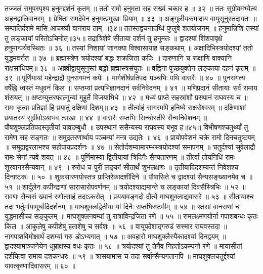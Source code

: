 तज्जलं समुपस्पृश्य हनुमद्दर्शनं कृतम् ॥
ततो रामो हनुमता सह सख्यं चकार ह ॥ ३२ ॥
ततः सुग्रीवमभ्येत्य अहनद्वालिवानरम् ॥
प्रेषिता रामदेवेन हनुमत्प्रमुखाः प्रियाम् ॥ ३३ ॥
अङ्गुलीयकमादाय वायुसूनुस्तदागतः ॥
सम्पातिर्दशमे मासि आचख्यौ वानराय ताम् ॥३४॥
ततस्तद्वचनादब्धिं पुप्लुवे शतयोजनम् ॥
हनुमान्निशि तस्यां तु लङ्कायां परितोऽचिनोत्॥३५॥
तद्रात्रिशेषे सीताया दर्शनं तु हनूमतः ॥
द्वादश्यां शिंशपावृक्षे हनुमान्पर्यवस्थितः ॥ ३६ ॥
तस्यां निशायां जानक्या विश्वासायाह सङ्कथाम् ॥
अक्षादिभिस्त्रयोदश्यां ततो युद्धमवर्त्तत ॥ ३७ ॥
ब्रह्मास्त्रेण त्रयोदश्यां बद्धः शक्रजिता कपिः ॥
दारुणानि च रूक्षाणि वाक्यानि राक्षसाधिपम्॥ ३८ ॥
अब्रवीद्वायुसूनुस्तं बद्धो ब्रह्मास्त्रसंयुतः ॥
वह्निना पुच्छयुक्तेन लङ्काया दहनं कृतम् ॥ ३९ ॥
पूर्णिमायां महेन्द्राद्रौ पुनरागमनं कपेः ॥
मार्गशीर्षप्रतिपदः पञ्चभिः पथि वासरैः ॥ ४० ॥
पुनरागत्य वर्षेह्नि ध्वस्तं मधुवनं किल ॥
सप्तम्यां प्रत्यभिज्ञानदानं सर्वनिवेदनम् ॥ ४१ ॥
मणिप्रदानं सीतायाः सर्वं रामाय शंसयत् ॥
अष्टम्युत्तरफाल्गुन्यां मुहूर्ते विजयाभिधे ॥ ४२ ॥
मध्यं प्राप्ते सहस्रांशौ प्रस्थानं राघवस्य च ॥
रामः कृत्वा प्रतिज्ञां हि प्रयातुं दक्षिणां दिशम्॥ ४३ ॥
तीर्त्वाहं सागरमपि हनिष्ये राक्षसेश्वरम् ॥
दक्षिणाशां प्रयातस्य सुग्रीवोऽथाभव त्सखा ॥ ४४ ॥
वासरैः सप्तभिः सिन्धोस्तीरे सैन्यनिवेशनम् ॥
पौषशुक्लप्रतिपदस्तृतीयां यावदम्बुधौ ॥
उपस्थानं ससैन्यस्य राघवस्य बभूव ह॥४५॥
विभीषणश्चतुर्थ्यां तु रामेण सह सङ्गतः ॥
समुद्रतरणार्थाय पञ्चम्यां मन्त्र उद्यतेः ॥ ४६ ॥
प्रायोपवेशनं चक्रे रामो दिनचतुष्टयम् ॥
समुद्राद्वरलाभश्च सहोपायप्रदर्शनः ॥ ४७ ॥
सेतोर्दशम्यामारम्भस्त्रयोदश्यां समापनम् ॥
चतुर्दश्यां सुवेलाद्रौ रामः सेनां न्यवे शयत् ॥ ४८ ॥
पूर्णिमास्या द्वितीयायां त्रिदिनैः सैन्यतारणम् ॥
तीर्त्वा तोयनिधिं रामः शूरवानरसैन्यवान् ॥ ४९ ॥
रुरोध च पुरीं लङ्कां सीतार्थं शुभलक्षणः ॥
तृतीयादिदशम्यन्तं निवेशश्च दिनाष्टकः ॥ ५० ॥
शुकसारणयोस्तत्र प्राप्तिरेकादशीदिने ॥
पौषासिते च द्वादश्यां सैन्यसङ्ख्यानमेव च ॥ ५१ ॥
शार्दूलेन कपीन्द्राणां सारासारोपवर्णनम् ॥
त्रयोदश्याद्यमान्ते च लङ्कायां दिवसैस्त्रिभिः ॥ ५२ ॥
रावणः सैन्यसं ख्यानं रणोत्साहं तदाऽकरोत् ॥
प्रययावङ्गदो दौत्ये माघशुक्लाद्यवासरे ॥ ५३ ॥
सीतायाश्च तदा भर्तुर्मायामूर्धादिदर्शनम् ॥
माघशुक्लद्वितीया यां दिनैः सप्तभिरष्टमीम् ॥ ५४ ॥
रक्षसां वानराणां च युद्धमासीच्च सङ्कुलम् ॥
माघशुक्लनवम्यां तु रात्राविन्द्रजिता रणे ॥ ५५ ॥
रामलक्ष्मणयोर्ना गपाशबन्धः कृतः किल ॥
आकुलेषु कपीशेषु हताशेषु च सर्वशः ॥ ५६ ॥
वायूपदेशाद्गरुडं सस्मार राघवस्तदा ॥
नागपाशविमोक्षार्थं दशम्यां गरु डोऽभ्यगात् ॥ ५७ ॥
अवहारो माघशुक्लैस्यैकादश्यां दिनद्वयम् ॥
द्वादश्यामाञ्जनेयेन धूम्राक्षस्य वधः कृतः ॥ ५८ ॥
त्रयोदश्यां तु तेनैव निहतोऽकम्पनो रणे ॥
मायासीतां दर्शयित्वा रामाय दशकन्धरः ॥ ५९ ॥
त्रासयामास च तदा सर्वान्सैन्यगतानपि ॥
माघशुक्लचतुर्द्दश्यां यावत्कृष्णादिवासरम् ॥ ६० ॥
